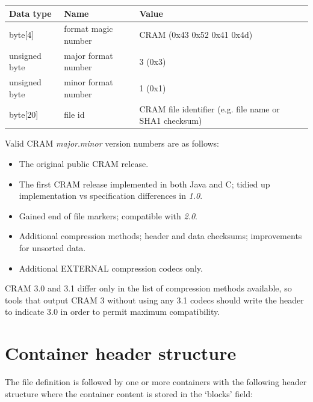 \documentclass[a4paper]{article}
\begin{document}
\begin{tabular}{|l|l|l|}
\hline
\textbf{Data type} & \textbf{Name} & \textbf{Value}\tabularnewline
\hline
byte[4] & format magic number & CRAM (0x43 0x52 0x41 0x4d)\tabularnewline
\hline
unsigned byte & major format number & 3 (0x3)\tabularnewline
\hline
unsigned byte & minor format number & 1 (0x1)\tabularnewline
\hline
byte[20] & file id & CRAM file identifier (e.g. file name or SHA1 checksum)\tabularnewline
\hline
\end{tabular}

Valid CRAM \textit{major}.\textit{minor} version numbers are as follows:

\begin{itemize}
\item[\textit{1.0}]
The original public CRAM release.

\item[\textit{2.0}]
The first CRAM release implemented in both Java and C; tidied up
implementation vs specification differences in \textit{1.0}.

\item[\textit{2.1}]
Gained end of file markers; compatible with \textit{2.0}.

\item[\textit{3.0}]
Additional compression methods; header and data checksums;
improvements for unsorted data.

\item[\textit{3.1}]
Additional EXTERNAL compression codecs only.
\end {itemize}

CRAM 3.0 and 3.1 differ only in the list of compression
methods available, so tools that output CRAM 3 without using any 3.1
codecs should write the header to indicate 3.0 in order to permit
maximum compatibility.

\section{\textbf{Container header structure}}
\label{sec:container}

The file definition is followed by one or more containers with the following header 
structure where the container content is stored in the `blocks' field:
\end{document}
